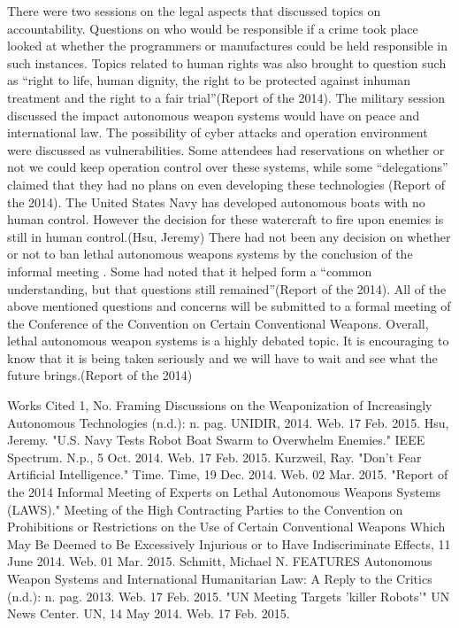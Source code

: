 There were two sessions on the legal aspects that discussed topics on accountability. Questions on who would be responsible if a crime took place looked at whether the programmers or manufactures could be held responsible in such instances. Topics related to human rights was also brought to question such as “right to life, human dignity, the right to be protected against inhuman treatment and the right to a fair trial”(Report of the 2014).
The military session discussed the impact autonomous weapon systems would have on peace and international law. The possibility of cyber attacks and operation environment were discussed as vulnerabilities. Some attendees had reservations on whether or not we could keep operation control over these systems, while some “delegations” claimed that they had no plans on even developing these technologies (Report of the 2014). The United States Navy has developed autonomous boats with no human control. However the decision for these watercraft to fire upon enemies is still in human control.(Hsu, Jeremy) 
There had not been any decision on whether or not to ban lethal autonomous weapons systems by the conclusion of the informal meeting . Some had noted that it helped form a “common understanding, but that questions still remained”(Report of the 2014). All of the above mentioned questions and concerns will be submitted to a formal meeting of the Conference of the Convention on Certain Conventional Weapons. Overall, lethal autonomous weapon systems is a highly debated topic. It is encouraging to know that it is being taken seriously and we will have to wait and see what the future brings.(Report of the 2014)






Works Cited
1, No. Framing Discussions on the Weaponization of Increasingly Autonomous Technologies (n.d.): n. pag. UNIDIR, 2014. Web. 17 Feb. 2015.
Hsu, Jeremy. "U.S. Navy Tests Robot Boat Swarm to Overwhelm Enemies." IEEE Spectrum. N.p., 5 Oct. 2014. Web. 17 Feb. 2015.
Kurzweil, Ray. "Don't Fear Artificial Intelligence." Time. Time, 19 Dec. 2014. Web. 02 Mar. 2015.
"Report of the 2014 Informal Meeting of Experts on Lethal Autonomous Weapons Systems (LAWS)." Meeting of the High Contracting Parties to the Convention on Prohibitions or Restrictions on the Use of Certain Conventional Weapons Which May Be Deemed to Be Excessively Injurious or to Have Indiscriminate Effects, 11 June 2014. Web. 01 Mar. 2015.
Schmitt, Michael N. FEATURES Autonomous Weapon Systems and International Humanitarian Law: A Reply to the Critics (n.d.): n. pag. 2013. Web. 17 Feb. 2015.
"UN Meeting Targets 'killer Robots'" UN News Center. UN, 14 May 2014. Web. 17 Feb. 2015.




